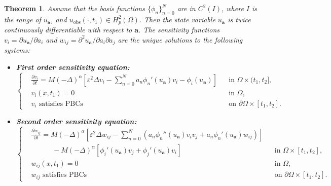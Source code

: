 \documentclass[11pt,reqno]{amsart}
\newtheorem{theorem}{Theorem}[section]
\begin{document}
\begin{theorem}\label{thm:differentiability}
	Assume that the basis functions $\{\phi_n\}_{n=0}^{N}$ are in $C^2(I)$, where $I$ is the range of $u_{\mathbf{a}}$, and $u_{\text{obs}}(\cdot,t_1)\in H_p^2(\Omega)$. Then the state variable $u_{\mathbf{a}}$ is twice continuously differentiable with respect to $\mathbf{a}$. The sensitivity functions $v_i = \partial u_{\mathbf{a}} / \partial a_i$ and $w_{ij} = \partial^2 u_{\mathbf{a}} / \partial a_i \partial a_j$ are the unique solutions to the following systems:
	\begin{itemize}
		\item[1.] \textbf{First order sensitivity equation:}
		\begin{equation}
			\label{equ:vi_full}
			\left\{
			\begin{aligned}
				&\frac{\partial v_i}{\partial t} = M(-\Delta)^{\alpha}\left[\varepsilon^2\Delta v_i - \sum_{n=0}^{N} a_{n}\phi_n'(u_{\mathbf{a}})v_i - \phi_i(u_{\mathbf{a}})\right] && \text{in } \Omega\times (t_1,t_2], \\
				&v_i(x,t_1) = 0 && \text{in } \Omega, \\
				& v_i \text{ satisfies PBCs} && \text{on } \partial\Omega\times[t_1,t_2].
			\end{aligned}
			\right.
		\end{equation}
		\item[2.] \textbf{Second order sensitivity equation:}
		\begin{equation}
			\label{equ:wij_full}
			\left\{
			\begin{aligned}
				&\frac{\partial w_{ij}}{\partial t} = M(-\Delta)^{\alpha}\left[\varepsilon^2\Delta w_{ij}-\sum\limits_{n=0}^N\left(a_{n}\phi_{n}''(u_{\mathbf{a}})v_iv_j+a_{n}\phi_n'(u_{\mathbf{a}})w_{ij}\right)\right] \\
				&\quad \quad \quad -M(-\Delta)^{\alpha}\left[\phi_i'(u_{\mathbf{a}})v_j+\phi_j'(u_{\mathbf{a}})v_i\right] && \text{in } \Omega\times [t_1,t_2], \\
				&w_{ij}(x,t_1) = 0 && \text{in } \Omega, \\
				&w_{ij}\text{ satisfies PBCs} && \text{on } \partial\Omega\times[t_1,t_2].
			\end{aligned}
			\right.
		\end{equation}
	\end{itemize}
\end{theorem}
\end{document}
